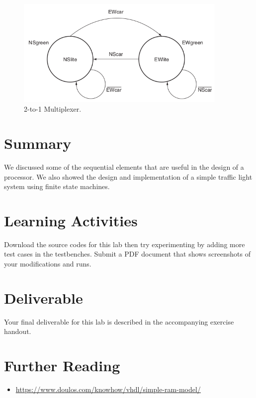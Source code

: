 \documentclass[a4paper, 11pt,oneside]{article}
\begin{document}
\begin{figure}[H]
	\begin{center}
	\includegraphics[width=4in]{fsm3.png}
	\caption{2-to-1 Multiplexer.}
	\label{fig:mux} 
	\end{center}
\end{figure}


\section{Summary}
We discussed some of the sequential elements that are useful in the design of a 
processor. We also showed the design and implementation of a simple traffic 
light system using finite state machines.

\section{Learning Activities}
Download the source codes for this lab then try experimenting by adding more 
test cases in the testbenches. Submit a PDF document that shows screenshots of 
your modifications and runs. 

\section{Deliverable}
Your final deliverable for this lab is described in the accompanying exercise handout.

\section{Further Reading}
\begin{itemize}
\item 
\href{https://www.doulos.com/knowhow/vhdl/simple-ram-model/}
{https://www.doulos.com/knowhow/vhdl/simple-ram-model/}
\end{itemize}





\nocite{*}
\end{document}
